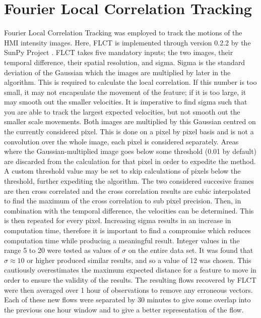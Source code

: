 \section{Fourier Local Correlation Tracking}
\label{flct}
Fourier Local Correlation Tracking \citep[FLCT;][]{welsch_ilct_2004,fisher_flct_2008} was employed to track the motions of the HMI intensity images. Here, FLCT is implemented through  version 0.2.2 by the SunPy Project \citep{barnes_sunpy_2020}. FLCT takes five mandatory inputs; the two images, their temporal difference, their spatial resolution, and sigma. Sigma is the standard deviation of the Gaussian which the images are multiplied by later in the algorithm. This is required to calculate the local correlation. If this number is too small, it may not encapsulate the movement of the feature; if it is too large, it may smooth out the smaller velocities. It is imperative to find sigma such that you are able to track the largest expected velocities, but not smooth out the smaller scale movements. Both images are multiplied by this Gaussian centred on the currently considered pixel. This is done on a pixel by pixel basis and is not a convolution over the whole image, each pixel is considered separately. Areas where the Gaussian-multiplied image goes below some threshold (0.01 by default) are discarded from the calculation for that pixel in order to expedite the method. A custom threshold value may be set to skip calculations of pixels below the threshold, further expediting the algorithm. The two considered succesive frames are then cross correlated and the cross correlation results are cubic interpolated to find the maximum of the cross correlation to sub pixel precision. Then, in combination with the temporal difference, the velocities can be determined. This is then repeated for every pixel. Increasing sigma results in an increase in computation time, therefore it is important to find a compromise which reduces computation time while producing a meaningful result. Integer values in the range 5 to 20 were tested as values of $\sigma$ on the entire data set. It was found that $\sigma\approx10$ or higher produced similar results, and so a value of 12 was chosen. This cautiously overestimates the maximum expected distance for a feature to move in order to ensure the validity of the results. The resulting flows recovered by FLCT were then averaged over 1 hour of observations to remove any erroneous vectors. Each of these new flows were separated by 30 minutes to give some overlap into the previous one hour window and to give a better representation of the flow.

